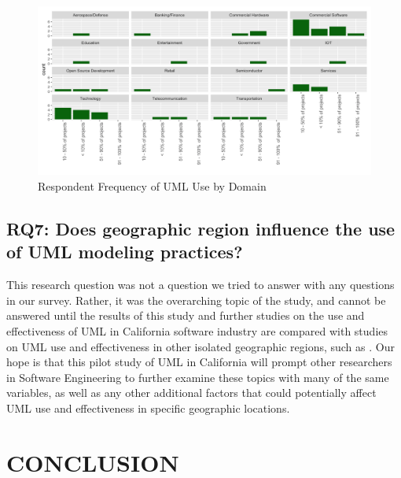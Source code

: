 \documentclass[letterpaper, 10 pt, conference]{ieeeconf}  %
\begin{document}
   \begin{figure}[!htb]
      \centering
      \includegraphics[scale=0.25]{Plots/DomFreqPlot}
      \caption{Respondent Frequency of UML Use by Domain}
      \label{DomFreqPlot}
   \end{figure}

\subsection{RQ7: Does geographic region influence the use of UML modeling practices?}

This research question was not a question we tried to answer with any questions in our survey. Rather, it was the overarching topic of the study, and cannot be answered until the results of this study and further studies on the use and effectiveness of UML in California software industry are compared with studies on UML use and effectiveness in other isolated geographic regions, such as \cite{c3}. Our hope is that this pilot study of UML in California will prompt other researchers in Software Engineering to further examine these topics with many of the same variables, as well as any other additional factors that could potentially affect UML use and effectiveness in specific geographic locations. 


\section{CONCLUSION}
\end{document}
